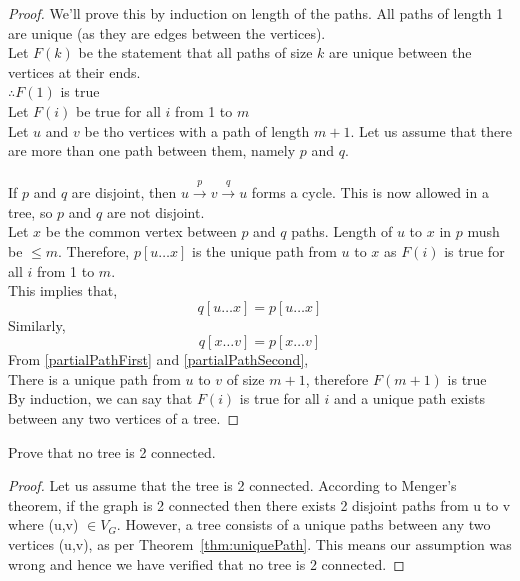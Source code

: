 \documentclass{article}
\begin{document}
\begin{proof}
    We'll prove this by induction on length of the paths. All paths of length 1 are unique (as they are edges between the vertices).\\
    Let $F(k)$ be the statement that all paths of size $k$ are unique between the vertices at their ends.\\
    $\therefore F(1)$ is true\\
    Let $F(i)$ be true for all $i$ from 1 to $m$\\
    Let $u$ and  $v$ be tho vertices with a path of length $m+1$. Let us assume that there are more than one path between them, namely $p$ and $q$.\\
    \\
    If $p$ and $q$ are disjoint, then $u\xrightarrow{p}v\xrightarrow{q}u$ forms a cycle. This is now allowed in a tree, so $p$ and $q$ are not disjoint.\\
    Let $x$ be the common vertex between $p$ and $q$ paths. Length of $u$ to $x$ in $p$ mush be $\leq m$. Therefore, $p[u\dots x]$ is the unique path from $u$ to $x$ as $F(i)$ is true for all $i$ from 1 to $m$.\\ 
    This implies that,\\
    \begin{equation}
        \label{partialPathFirst}
        q[u\dots x] = p[u\dots x]
    \end{equation}
    Similarly,
    \begin{equation}
        \label{partialPathSecond}
        q[x\dots v] = p[x\dots v]
    \end{equation}
    From \ref{partialPathFirst} and \ref{partialPathSecond},\\
    There is a unique path from $u$ to $v$ of size $m+1$, therefore $F(m+1)$ is true\\
    By induction, we can say that $F(i)$ is true for all $i$ and a unique path exists between any two vertices of a tree.

\end{proof}


\begin{corollary}
    Prove that no tree is 2 connected.
    \begin{proof}
        Let us assume that the tree is 2 connected. According to Menger's theorem, if the graph is 2 connected then there exists 2 disjoint paths from u to v where (u,v) $\in V_G$. However, a tree consists of a unique paths between any two vertices (u,v), as per Theorem~\ref{thm:uniquePath}. This means our assumption was wrong and hence we have verified that no tree is 2 connected.
    \end{proof}
\end{corollary}
\end{document}
